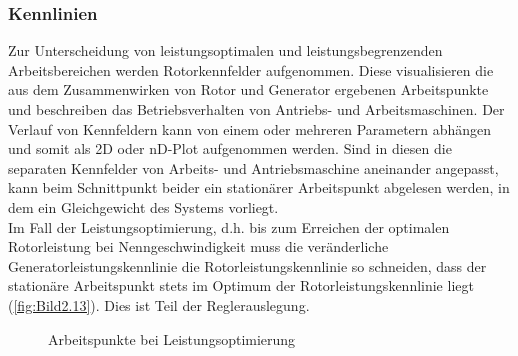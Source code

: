 \subsubsection{Kennlinien}
Zur Unterscheidung von leistungsoptimalen und leistungsbegrenzenden Arbeitsbereichen werden Rotorkennfelder aufgenommen. Diese visualisieren die aus dem Zusammenwirken von Rotor und Generator ergebenen Arbeitspunkte und beschreiben das Betriebsverhalten von Antriebs- und Arbeitsmaschinen. Der Verlauf von Kennfeldern kann von einem oder mehreren Parametern abhängen und somit als 2D oder nD-Plot aufgenommen werden. Sind in diesen die separaten Kennfelder von Arbeits- und Antriebsmaschine aneinander angepasst, kann beim Schnittpunkt beider ein stationärer Arbeitspunkt abgelesen werden, in dem ein Gleichgewicht des Systems vorliegt.\\
\newline
Im Fall der Leistungsoptimierung, d.h. bis zum Erreichen der optimalen Rotorleistung bei Nenngeschwindigkeit muss die veränderliche Generatorleistungskennlinie die Rotorleistungskennlinie so schneiden, dass der stationäre Arbeitspunkt stets im Optimum der Rotorleistungskennlinie liegt (\autoref{fig:Bild2.13}). Dies ist Teil der Reglerauslegung.
\begin{figure}[H]
   \centering
   \caption[Arbeitspunkte bei Leistungsoptimierung]{Arbeitspunkte bei Leistungsoptimierung \cite{SkriptSchulte}}
   \label{fig:Bild2.13}
\end{figure}

